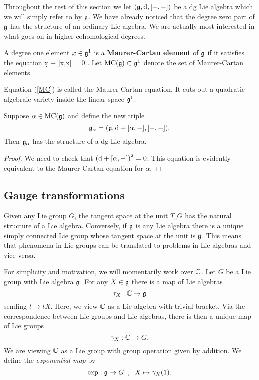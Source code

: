 \documentclass[11pt]{amsart}
\begin{document}
Throughout the rest of this section we let $(\mathfrak g, {\rm d}, [-,-])$ be a dg Lie algebra which we will simply refer to by $\mathfrak g$.
We have already noticed that the degree zero part of $\mathfrak g$ has the structure of an ordinary Lie algebra.
We are actually most interested in what goes on in higher cohomological degrees. 

\begin{dfn}
A degree one element $x \in \mathfrak g^1$ is a {\bf Maurer-Cartan element} of $\mathfrak g$ if it satisfies the equation
\beqn\label{MC}
\d x +  [x,x] = 0 .
\eeqn
Let ${\rm MC} (\mathfrak g) \subset \mathfrak g^1$ denote the set of Maurer-Cartan elements. 
\end{dfn}

Equation (\ref{MC}) is called the Maurer-Cartan equation.  
It cuts out a quadratic algebraic variety inside the linear space $\mathfrak g^1$. 

\begin{lem}\label{lem: easy}
Suppose $\alpha \in {\rm MC}(\mathfrak g)$ and define the new triple
\[
\mathfrak g_\alpha = (\mathfrak g, {\rm d} + [\alpha,-], [-,-]) .
\]
Then $\mathfrak g_{\alpha}$ has the structure of a dg Lie algebra. 
\end{lem}
\begin{proof}
We need to check that $\left({\rm d} + [\alpha,-]\right)^2 = 0$. 
This equation is evidently equivalent to the Maurer-Cartan equation for $\alpha$. 
\end{proof}

\subsection{Gauge transformations}

Given any Lie group $G$, the tangent space at the unit $T_e G$ has the natural structure of a Lie algebra. 
Conversely, if $\mathfrak g$ is any Lie algebra there is a unique simply connected Lie group whose tangent space at the unit is $\mathfrak g$. 
This means that phenomena in Lie groups can be translated to problems in Lie algebras and vice-versa. 

For simplicity and motivation, we will momentarily work over $\mathbb C$. 
Let $G$ be a Lie group with Lie algebra $\mathfrak g$. 
For any $X \in \mathfrak g$ there is a map of Lie algebras
\[
\tau_X : \mathbb C \to \mathfrak g
\]
sending $t \mapsto t X$. 
Here, we view $\mathbb C$ as a Lie algebra with trivial bracket. 
Via the correspondence between Lie groups and Lie algebras, there is then a unique map of Lie groups
\[
\gamma_X : \mathbb C \to G .
\]
We are viewing $\mathbb C$ as a Lie group with group operation given by addition. 
We define the {\em exponential map} by
\[
\exp : \mathfrak g \to G \;\; , \;\; X \mapsto \gamma_X(1) .
\] 
\end{document}
